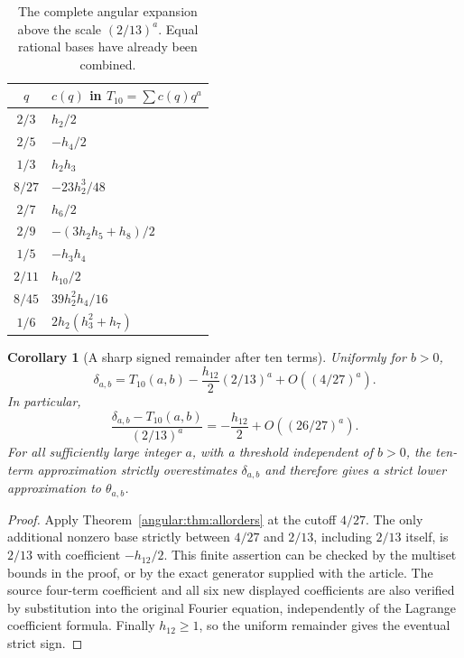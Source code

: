 \documentclass[11pt,a4paper]{article}
\newtheorem{corollary}[theorem]{Corollary}
\theoremstyle{definition}
\theoremstyle{remark}
\numberwithin{equation}{section}
\begin{document}
\begin{table}[ht]
\centering
\caption{The complete angular expansion above the scale $(2/13)^a$.
Equal rational bases have already been combined.}
\label{angular:tab:ten}
\begin{tabular}{@{}cl@{}}
\toprule
$q$& $c(q)$ in $T_{10}=\sum c(q)q^a$\\
\midrule
$2/3$ & $h_2/2$\\
$2/5$ & $-h_4/2$\\
$1/3$ & $h_2h_3$\\
$8/27$ & $-23h_2^3/48$\\
$2/7$ & $h_6/2$\\
$2/9$ & $-(3h_2h_5+h_8)/2$\\
$1/5$ & $-h_3h_4$\\
$2/11$ & $h_{10}/2$\\
$8/45$ & $39h_2^2h_4/16$\\
$1/6$ & $2h_2(h_3^2+h_7)$\\
\bottomrule
\end{tabular}
\end{table}

\begin{corollary}[A sharp signed remainder after ten terms]
\label{angular:cor:ten}
Uniformly for $b>0$,
\begin{equation}\label{angular:eq:eleven}
 \delta_{a,b}=T_{10}(a,b)-\frac{h_{12}}2(2/13)^a
       +O((4/27)^a).
\end{equation}
In particular,
\[
 \frac{\delta_{a,b}-T_{10}(a,b)}{(2/13)^a}
   =-\frac{h_{12}}2+O((26/27)^a).
\]
For all sufficiently large integer $a$, with a threshold independent
of $b>0$, the ten-term approximation strictly overestimates
$\delta_{a,b}$ and therefore gives a strict lower approximation to
$\theta_{a,b}$.
\end{corollary}

\begin{proof}
Apply Theorem~\ref{angular:thm:allorders} at the cutoff $4/27$.
The only additional nonzero base strictly between $4/27$ and
$2/13$, including $2/13$ itself, is $2/13$ with coefficient
$-h_{12}/2$.  This finite assertion can be checked by the multiset
bounds in the proof, or by the exact generator supplied with the
article.  The source four-term coefficient and all six new displayed
coefficients are also verified by substitution into the original
Fourier equation, independently of the Lagrange coefficient formula.
Finally $h_{12}\geq1$, so the uniform remainder gives the eventual
strict sign.
\end{proof}
\end{document}
